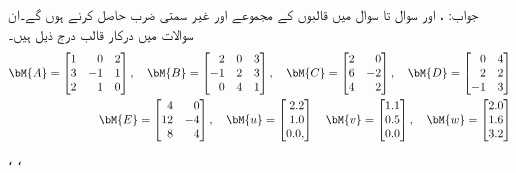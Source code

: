 جواب: ،  اور 
سوال  تا سوال  میں قالبوں کے مجموعے اور غیر سمتی ضرب حاصل کرنے ہوں گے۔ان سوالات میں درکار قالب درج ذیل ہیں۔
\begin{align*}
\bM{A}=
\begin{bmatrix*}[r]
1&0&2\\
3&-1&1\\
2&1&0
\end{bmatrix*},\quad \bM{B}=
\begin{bmatrix*}[r]
2&0&3\\
-1&2&3\\
0&4&1
\end{bmatrix*},\quad
\bM{C}=
\begin{bmatrix*}[r]
2&0\\
6&-2\\
4&2
\end{bmatrix*},\quad
\bM{D}=
\begin{bmatrix*}[r]
0&4\\
2&2\\
-1&3
\end{bmatrix*}\\
\bM{E}=
\begin{bmatrix*}[r]
4&0\\
12&-4\\
8&4
\end{bmatrix*},\quad
\bM{u}=
\begin{bmatrix*}[r]
2.2\\
1.0\\
0.0,
\end{bmatrix*}\quad
\bM{v}=
\begin{bmatrix*}[r]
1.1\\
0.5\\
0.0
\end{bmatrix*},\quad
\bM{w}=
\begin{bmatrix*}[r]
2.0\\
1.6\\
3.2
\end{bmatrix*}
\end{align*}
، ، 

